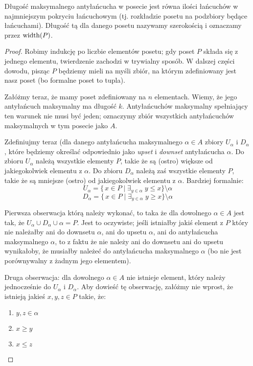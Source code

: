\begin{theorem}
	Długość maksymalnego antyłańcucha w posecie jest równa ilości łańcuchów w najmniejszym pokryciu łańcuchowym
	(tj. rozkładzie posetu na podzbiory będące łańcuchami). Długość tą dla danego posetu nazywamy szerokością i oznaczamy
	przez $\text{width}(P)$.
\end{theorem}

\begin{proof}
	Robimy indukcję po liczbie elementów posetu; gdy poset \(P\) składa się z jednego elementu, twierdzenie zachodzi w trywialny sposób. W dalszej części dowodu, pisząc \(P\) będziemy mieli na myśli zbiór, na którym zdefiniowany jest nasz poset (bo formalne poset to tupla).

	Załóżmy teraz, że mamy poset zdefiniowany na \(n\) elementach. Wiemy, że jego antyłańcuch maksymalny ma długość \(k\). Antyłańcuchów maksymalny spełniający ten warunek nie musi być jeden; oznaczymy zbiór wszystkich antyłańcuchów maksymalnych w tym posecie jako \(A\).

	Zdefiniujmy teraz (dla danego antyłańcucha maksymalnego \( \alpha \in A\) zbiory \(U_{\alpha}\) i \(D_{\alpha}\), które będziemy określać odpowiednio jako \textit{upset} i \textit{downset} antyłańcucha \(\alpha\). Do zbioru \(U_{\alpha}\) należą wszystkie elementy \(P\), takie że są (ostro) większe od jakiegokolwiek elementu z \(\alpha\). Do zbioru \(D_{\alpha}\) należą zaś wszystkie elementy \(P\), takie że są mniejsze (ostro) od jakiegokolwiek elementu z \(\alpha\). Bardziej formalnie:
	\begin{equation*}
		U_{\alpha} = \{\,x \in P \mid \exists_{y \in \alpha} \;  y \leq x \} \setminus \alpha
	\end{equation*}
	\begin{equation*}
		D_{\alpha} = \{\,x \in P \mid \exists_{y \in \alpha} \; y \geq x \} \setminus \alpha
	\end{equation*}

	Pierwsza obserwacja którą należy wykonać, to taka że dla dowolnego \(\alpha \in A\) jest tak, że  \(U_{\alpha} \cup D_{\alpha} \cup \alpha = P\). Jest to oczywiste; jeśli istniałby jakiś element z \(P\) który nie należałby ani do downsetu \(\alpha\), ani do upsetu \(\alpha\), ani do antyłańcucha maksymalnego \(\alpha\), to z faktu że nie należy ani do downsetu ani do upsetu wynikałoby, że musiałby należeć do antyłańcucha maksymalnego \(\alpha\) (bo nie jest porównywalny z żadnym jego elementem).

	Druga obserwacja: dla dowolnego \(\alpha \in A\) nie istnieje element, który należy jednocześnie do \(U_{\alpha}\) i \(D_{\alpha}\). Aby dowieść tę obserwację, załóżmy nie wprost, że istnieją jakieś \(x, y, z \in P\) takie, że:
	\begin{enumerate}
		\item \(y, z \in \alpha\)
		\item \( x \geq y\)
		\item \( x \leq z\)
	\end{enumerate}


\end{proof}
